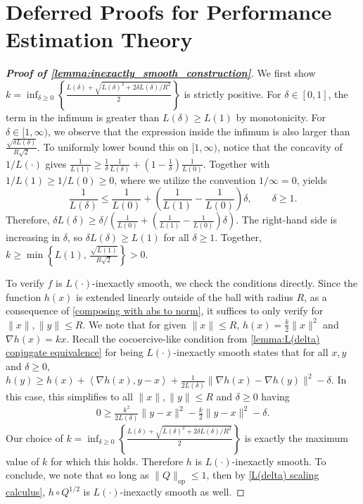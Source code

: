 \documentclass[11pt, hidelinks]{article}
\numberwithin{equation}{section}
\theoremstyle{thmstyletwo}%
\numberwithin{equation}{section}
\newcommand{\inner}[2]{\left\langle {#1}, {#2} \right\rangle}
\begin{document}
\section{Deferred Proofs for Performance Estimation Theory}\label{sec: appendix PEP}


\begin{proof}[\bf Proof of \cref{lemma:inexactly_smooth_construction}]
We first show $k  = \inf_{\delta \geq 0} \left\{\frac{L\left(\delta\right)+\sqrt{L\left(\delta\right)^{2}+2\delta L\left(\delta\right)/R^2}}{2}\right\}$ is strictly positive. For $\delta \in [0,1]$, the term in the infimum is greater than $L(\delta) \geq L(1)$ by monotonicity.  For $\delta\in [1,\infty)$, we observe that the expression inside the infimum is also larger than
$\frac{\sqrt{\delta L(\delta)}}{R\sqrt{2}}$. To uniformly lower bound this on $[1,\infty)$, notice that the concavity of $1/L(\cdot)$ gives $\frac{1}{L(1)} \geq \frac{1}{\delta}\frac{1}{L(\delta)}+\left(1-\frac{1}{\delta}\right)\frac{1}{L(0)}.$ Together with $1/L(1) \geq 1/L(0) \geq 0$, where we utilize the convention $1/\infty = 0$, yields
$$
\frac{1}{L(\delta)}\leq\frac{1}{L(0)}+\left(\frac{1}{L(1)}-\frac{1}{L(0)}\right)\delta, \qquad \delta\geq 1.
$$
Therefore, $\delta L(\delta)\geq \delta/\left(\frac{1}{L(0)}+\left(\frac{1}{L(1)}-\frac{1}{L(0)}\right)\delta\right).$ The right-hand side is increasing in $\delta$, so $\delta L(\delta)\geq L(1)$ for all $\delta\geq 1$. Together,
$
k \geq  \min\left\{L(1), \, \frac{\sqrt{L(1)}}{R\sqrt{2}}\right\} > 0. 
$

    To verify $f$ is $L(\cdot)$-inexactly smooth, we check the conditions directly. Since the function $h(x)$ is extended linearly outside of the ball with radius $R$, as a consequence of \cref{composing with abs to norm}, it suffices to only verify for $\|x\|, \|y\| \leq R$.  We note that for given $\|x\| \leq R$, $h(x) = \frac{k}{2}\|x\|^2$ and $\nabla h(x) = kx$. Recall the cocoercive-like condition from \cref{lemma:L(delta) conjugate equivalence} for being $L(\cdot)$-inexactly smooth states that for all $x, y$ and $\delta\geq 0$, $h(y) \geq h(x) + \inner{\nabla h(x)}{y-x}+\frac{1}{2L(\delta)}\|\nabla h(x)-\nabla h(y)\|^2 - \delta$.
    In this case, this simplifies to all $\|x\|, \|y\| \leq R$ and $\delta\geq 0$ having
    \begin{align*}
       0 \geq \frac{k^2}{2L(\delta)}\|y-x\|^2 - \frac{k}{2}\|y-x\|^2 - \delta  .
    \end{align*}
  Our choice of $k =  \inf_{\delta \geq 0} \left\{\frac{L\left(\delta\right)+\sqrt{L\left(\delta\right)^{2}+2\delta L\left(\delta\right)/R^2}}{2}\right\}$ is exactly the maximum value of $k$ for which this holds.
  Therefore $h$ is $L(\cdot)$-inexactly smooth. To conclude, we note that so long as $\|Q\|_{\mathrm{op}} \leq 1$, then by \cref{L(delta) scaling calculus}, $h \circ Q^{1/2}$ is $L(\cdot)$-inexactly smooth as well.
\end{proof}
\end{document}
